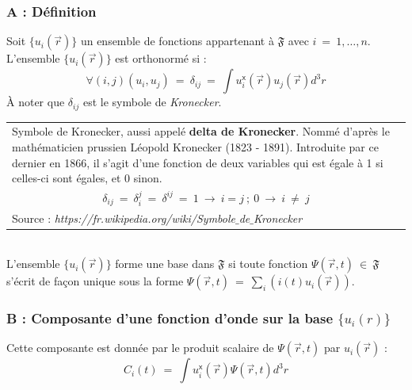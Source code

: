 \documentclass[12pt,a4paper,titlepage]{book}
\begin{document}
\subsubsection{A : Définition}
Soit $\lbrace u_i (\overrightarrow{r}) \rbrace$ un ensemble de fonctions appartenant à $\mathfrak{F}$ avec $i ~=~ 1, \ldots, n$. L'ensemble $\lbrace u_i (\overrightarrow{r}) \rbrace$ est orthonormé si :\\
\begin{equation*}
\forall (i, j) (u_i, u_j) ~=~ \delta_{ij} ~=~ \int u_i^{\mathsf{x}} (\overrightarrow{r}) u_j (\overrightarrow{r}) d^3 r
\end{equation*}
À noter que $\delta_{ij}$ est le symbole de \textit{Kronecker}.\\


\begin{tabular}{|p{15cm}|}
\hline
Symbole de Kronecker, aussi appelé \textbf{delta de Kronecker}. Nommé d'après le mathématicien prussien Léopold Kronecker (1823 - 1891). Introduite par ce dernier en 1866, il s'agit d'une fonction de deux variables qui est égale à 1 si celles-ci sont égales, et 0 sinon.\\
\begin{equation*}
\delta_{ij} ~=~ \delta_i^j ~=~ \delta^{ij} ~=~ 1 ~\rightarrow~ i = j ~;~ 0 ~\rightarrow~ i ~\neq~ j
\end{equation*}\\

Source : \textit{https://fr.wikipedia.org/wiki/Symbole$\_$de$\_$Kronecker}\\
\hline
\end{tabular}\\

L'ensemble $\lbrace u_i (\overrightarrow{r}) \rbrace$ forme une base dans $\mathfrak{F}$ si toute fonction $\Psi (\overrightarrow{r}, t) ~\in~ \mathfrak{F}$ s'écrit de façon unique sous la forme $\Psi (\overrightarrow{r}, t) ~=~ \sum\limits_{i} (i(t)u_i(\overrightarrow{r}))$.

\subsubsection{B : Composante d'une fonction d'onde sur la base $\lbrace u_i (r) \rbrace$}

Cette composante est donnée par le produit scalaire de $\Psi (\overrightarrow{r}, t)$ par $u_i (\overrightarrow{r})$ :\\
\begin{equation*}
C_i (t) ~=~ \int u_i^{\mathsf{x}} (\overrightarrow{r}) \Psi (\overrightarrow{r}, t) d^3 r
\end{equation*}
\end{document}
